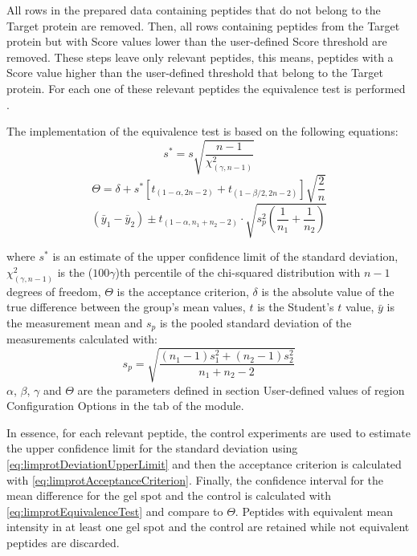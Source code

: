 All rows in the prepared data containing peptides that do not belong to the Target
protein are removed. Then, all rows containing peptides from the Target protein
but with Score values lower than the user-defined Score threshold are removed. These
steps leave only relevant peptides, this means, peptides with a Score value higher
than the user-defined threshold that belong to the Target protein. For each one of
these relevant peptides the equivalence test is performed \cite{Limentani2005}.

The implementation of the equivalence test is based on the following equations:
\begin{equation}
    \label{eq:limprotDeviationUpperLimit}
    s^* = s\sqrt{\frac{n-1}{\chi^2_{(\gamma, n-1)}}}
\end{equation}
\begin{equation}
\label{eq:limprotAcceptanceCriterion}
\Theta = \delta + s^*\left[t_{(1-\alpha, 2n-2)} + t_{(1-\beta/2, 2n-2)}\right]\sqrt{\frac{2}{n}}
\end{equation}
\begin{equation}
\label{eq:limprotEquivalenceTest}
(\bar{y}_1 - \bar{y}_2) \pm t_{(1-\alpha, n_1+n_2-2)} \cdot \sqrt{s^2_p\left(\frac{1}{n_1}+\frac{1}{n_2}\right)}
\end{equation}

where $s^*$ is an estimate of the upper confidence limit of the standard deviation,
$\chi^2_{(\gamma, n-1)}$ is the ($100\gamma$)th percentile of the chi-squared distribution
with $n-1$ degrees of freedom, $\Theta$ is the acceptance criterion, $\delta$ is the
absolute value of the true difference between the group's mean values, $t$ is the
Student's $t$ value, $\bar{y}$ is the measurement mean and $s_p$ is the pooled standard
deviation of the measurements calculated with:
\begin{equation}
\label{eq:poolStDev}
s_p =  \sqrt{\frac{(n_1-1)s^2_1+(n_2-1)s^2_2}{n_1+n_2-2}}
\end{equation}
$\alpha$, $\beta$, $\gamma$ and $\Theta$ are the parameters defined in section
User-defined values of region Configuration Options in the tab of the module.

In essence, for each relevant peptide, the control experiments are used to estimate
the upper confidence limit for the standard deviation using \autoref{eq:limprotDeviationUpperLimit}
and then the acceptance criterion is calculated with \autoref{eq:limprotAcceptanceCriterion}.
Finally, the confidence interval for the mean difference for the gel spot and the
control is calculated with \autoref{eq:limprotEquivalenceTest} and compare to $\Theta$.
Peptides with equivalent mean intensity in at least one gel spot and the control
are retained while not equivalent peptides are discarded.

